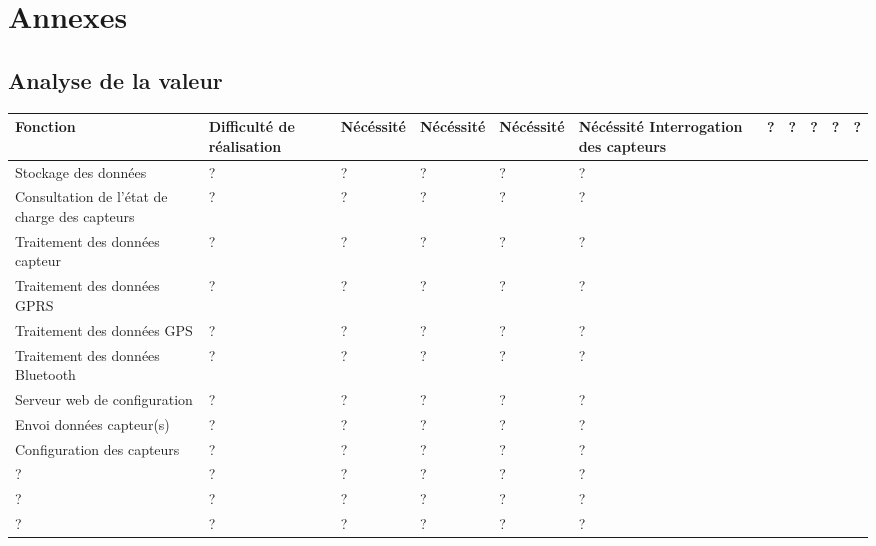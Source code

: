 \vfil
\pagebreak
\section{Annexes}

\subsection{Analyse de la valeur}

\begin{center}
\begin{longtable}{|m{6cm}|m{17mm}|m{17mm}|m{17mm}|m{17mm}|m{17mm}|}
\hline
Fonction & Difficulté de réalisation & Nécéssité & Nécéssité & Nécéssité & Nécéssité\endhead
\hline
Interrogation des capteurs
& %
?
& %
?
& %
?
& %
?
& %
?
\\\hline%
Stockage des données
& %
?
& %
?
& %
?
& %
?
& %
?
\\\hline%
Consultation de l'état de charge des capteurs
& %
?
& %
?
& %
?
& %
?
& %
?
\\\hline%
Traitement des données capteur
& %
?
& %
?
& %
?
& %
?
& %
?
\\\hline%
Traitement des données GPRS
& %
?
& %
?
& %
?
& %
?
& %
?
\\\hline%
Traitement des données GPS
& %
?
& %
?
& %
?
& %
?
& %
?
\\\hline%
Traitement des données Bluetooth
& %
?
& %
?
& %
?
& %
?
& %
?
\\\hline%
Serveur web de configuration
& %
?
& %
?
& %
?
& %
?
& %
?
\\\hline%
Envoi données capteur(s)
& %
?
& %
?
& %
?
& %
?
& %
?
\\\hline%
Configuration des capteurs
& %
?
& %
?
& %
?
& %
?
& %
?
\\\hline%
?
& %
?
& %
?
& %
?
& %
?
& %
?
\\\hline%
?
& %
?
& %
?
& %
?
& %
?
& %
?
\\\hline%
?
& %
?
& %
?
& %
?
& %
?
& %
?
\\\hline
\end{longtable}
\end{center}
